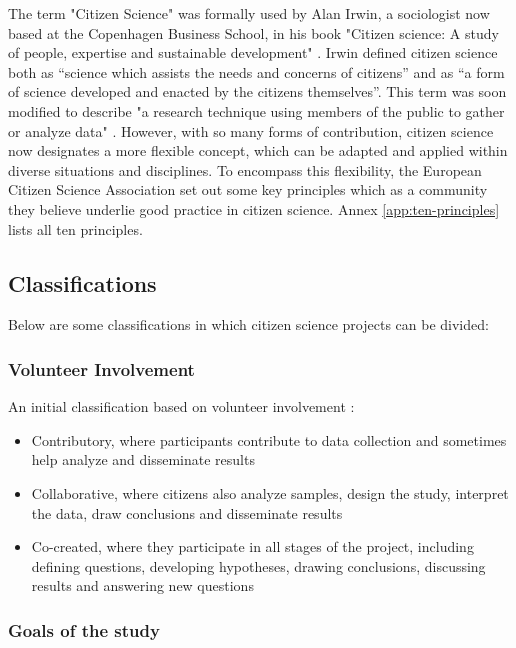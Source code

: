 The term "Citizen Science" was formally used by Alan Irwin, a sociologist now based at the Copenhagen Business School, in his book "Citizen science: A study of people, expertise and sustainable development" \cite{irwin1995citizen}. Irwin defined citizen science both as “science which assists the needs and concerns of citizens” and as “a form of science developed and enacted by the citizens themselves”. This term was soon modified to describe "a research technique using members of the public to gather or analyze data" \cite{bonney2009citizen}. However, with so many forms of contribution, citizen science now designates a more flexible concept, which can be adapted and applied within diverse situations and disciplines. To encompass this flexibility, the European Citizen Science Association \cite{robinson2018ten} set out some key principles which as a community they believe underlie good practice in citizen science. Annex \ref{app:ten-principles} lists all ten principles.

\subsection{Classifications}

Below are some classifications in which citizen science projects can be divided:

\subsubsection*{Volunteer Involvement}

An initial classification based on volunteer involvement \cite{follett2015analysis}: 
\begin{itemize}
    \item Contributory, where participants contribute to data collection and sometimes help analyze and disseminate results
    \item Collaborative, where citizens also analyze samples, design the study, interpret the data, draw conclusions and disseminate results
    \item Co-created, where they participate in all stages of the project, including defining questions, developing hypotheses, drawing conclusions, discussing results and answering new questions
\end{itemize}

\subsubsection*{Goals of the study}

